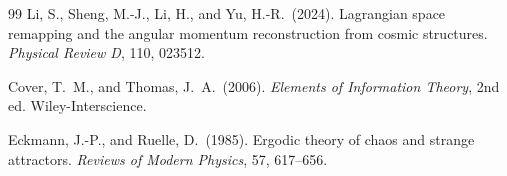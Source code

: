 \documentclass[11pt]{article}
\begin{document}
\begin{thebibliography}{99}
Li, S., Sheng, M.-J., Li, H., and Yu, H.-R.\ (2024). Lagrangian space remapping and the angular momentum reconstruction from cosmic structures. \textit{Physical Review D}, 110, 023512.

Cover, T.\ M., and Thomas, J.\ A.\ (2006). \textit{Elements of Information Theory}, 2nd ed. Wiley-Interscience.

Eckmann, J.-P., and Ruelle, D.\ (1985). Ergodic theory of chaos and strange attractors. \textit{Reviews of Modern Physics}, 57, 617--656.

\end{thebibliography}
\end{document}
